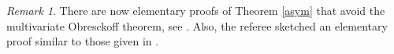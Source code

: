 \documentclass[10pt,reqno]{amsart}
\theoremstyle{plain}
\newtheorem{proposition}[theorem]{Proposition}
\theoremstyle{definition}
\theoremstyle{remark}
\newtheorem{remark}{Remark}[section]
\newcommand{\CC}{\mathbb{C}}
\newcommand{\fS}{\mathfrak{S}}
\begin{document}
\begin{remark}
There are now elementary proofs of Theorem \ref{asym} that avoid the 
multivariate Obresckoff theorem, see \cite{BB,L3}. Also, the referee 
sketched an elementary proof similar to those given in \cite{BB,L3}.
\end{remark}


\end{document}
